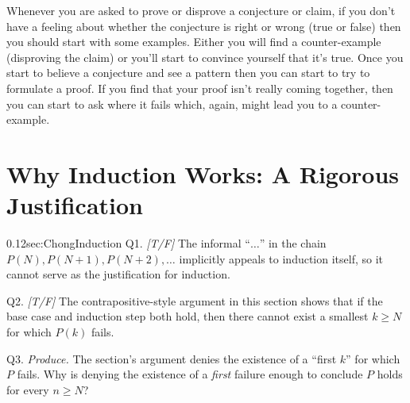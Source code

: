 \noindent Whenever you are asked to prove or disprove a conjecture or claim, if you don't have a feeling about whether the conjecture is right or wrong (true or false) then you should start with some examples.  Either you will find a counter-example (disproving the claim) or you'll start to convince yourself that it's true.  Once you start to believe a conjecture and see a pattern then you can start to try to formulate a proof.  If you find that your proof isn't really coming together, then you can start to ask where it fails which, again, might lead you to a counter-example.


\section{Why Induction Works: A Rigorous Justification}
\label{sec:WhyInductionWorks}

\begin{selfcheckbox}{0.12}{sec:ChongInduction}
  \hypertarget{q:ch0:whyinduction}{}
  Q1. \textit{[T/F]} The informal ``$\ldots$'' in the chain $P(N), P(N+1), P(N+2), \ldots$ implicitly appeals to induction itself, so it cannot serve as the justification for induction.\par\smallskip
  Q2. \textit{[T/F]} The contrapositive-style argument in this section shows that if the base case and induction step both hold, then there cannot exist a smallest $k \geq N$ for which $P(k)$ fails.\par\smallskip
  Q3. \textit{Produce.} The section's argument denies the existence of a ``first $k$'' for which $P$ fails. Why is denying the existence of a \emph{first} failure enough to conclude $P$ holds for every $n \geq N$?
  \par\medskip\hfill{}
\end{selfcheckbox}

